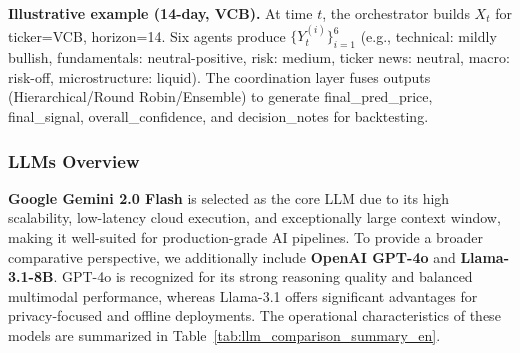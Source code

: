 \documentclass{ieeeaccess}
\begin{document}
\noindent\textbf{Illustrative example (14-day, VCB).}  
At time $t$, the orchestrator builds $X_t$ for ticker=VCB, horizon=14. Six agents produce $\{Y_t^{(i)}\}_{i=1}^{6}$ (e.g., technical: mildly bullish, fundamentals: neutral-positive, risk: medium, ticker news: neutral, macro: risk-off, microstructure: liquid). The coordination layer fuses outputs (Hierarchical/Round Robin/Ensemble) to generate final\_pred\_price, final\_signal, overall\_confidence, and decision\_notes for backtesting.

\subsubsection{LLMs Overview}
\textbf{Google Gemini 2.0 Flash} is selected as the core LLM due to its high scalability, low-latency cloud execution, and exceptionally large context window, making it well-suited for production-grade AI pipelines. To provide a broader comparative perspective, we additionally include \textbf{OpenAI GPT-4o} and \textbf{Llama-3.1-8B}. GPT-4o is recognized for its strong reasoning quality and balanced multimodal performance, whereas Llama-3.1 offers significant advantages for privacy-focused and offline deployments. The operational characteristics of these models are summarized in Table~\ref{tab:llm_comparison_summary_en}.

\begin{table}[h!]
\centering
\caption{Operational Characteristics and Execution Behavior of Leading Large Language Models.}
\label{tab:llm_comparison_summary_en}
\end{table}
\end{document}
